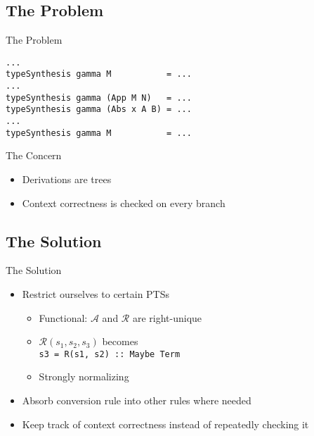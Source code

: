 \documentclass{beamer}
\begin{document}
\subsection{The Problem}

\begin{frame}[fragile]{The Problem}


  \smallskip

  \small{\begin{verbatim}
...
typeSynthesis gamma M           = ...
...
typeSynthesis gamma (App M N)   = ...
typeSynthesis gamma (Abs x A B) = ...
...
typeSynthesis gamma M           = ...
  \end{verbatim}}

\end{frame}


\begin{frame}{The Concern}


  \begin{itemize}
    \item
      Derivations are trees
    \item
      Context correctness is checked on every branch
  \end{itemize}

\end{frame}


\subsection{The Solution}

\begin{frame}{The Solution}

  \begin{itemize}
    \item
      Restrict ourselves to certain PTSs
      \begin{itemize}
        \item Functional: $\mathcal{A}$ and $\mathcal{R}$ are right-unique
        \item $\mathcal{R}(s_1, s_2, s_3)$ becomes \\
              \texttt{s3 = R(s1, s2) :: Maybe Term}
        \item Strongly normalizing
      \end{itemize}
    \item
      Absorb conversion rule into other rules where needed
    \item
      Keep track of context correctness instead of repeatedly checking it
  \end{itemize}

\end{frame}
\end{document}
